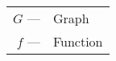\bgroup
\def\arraystretch{1.5}
\setlength\tabcolsep{2pt}
\begin{tabular}{r l}
    $G$     --- & Graph     \\
    $f$     --- & Function
\end{tabular}
\egroup